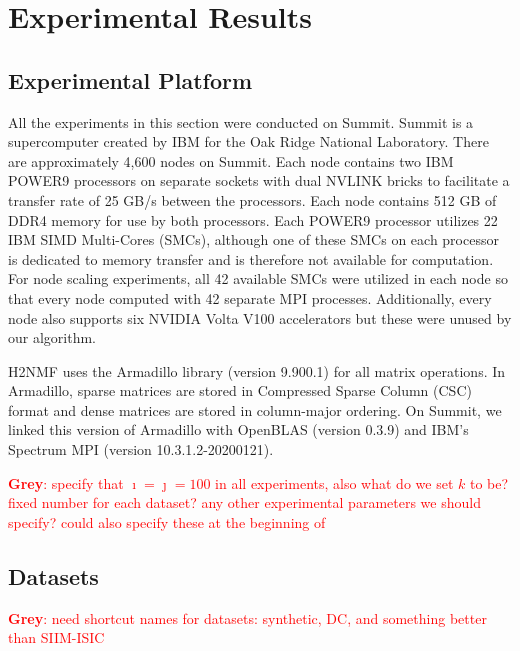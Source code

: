 \documentclass[conference,compsoc]{IEEEtran}
\newcommand{\GB}[1]{\textcolor{red}{\textbf{Grey}: #1}}
\newcommand{\image}{SIIM-ISIC}
\begin{document}
\section{Experimental Results}
\label{sec:results}

\subsection{Experimental Platform}
\label{sec:summit}

All the experiments in this section were conducted on Summit. Summit is a supercomputer created by IBM for the Oak Ridge National Laboratory. 
There are approximately 4,600 nodes on Summit. Each node contains two IBM POWER9 processors on separate sockets with dual NVLINK bricks to facilitate a transfer rate of 
25 GB/s between the processors. Each node contains 512 GB of DDR4 memory for use by both processors. Each POWER9 processor utilizes 22 IBM SIMD Multi-Cores (SMCs), 
although one of these SMCs on each processor is dedicated to memory transfer and is therefore not available for computation. 
For node scaling experiments, all 42 available SMCs were utilized in each node so that every node computed with 42 separate MPI processes.
Additionally, every node also supports six NVIDIA Volta V100 accelerators but these were unused by our algorithm. 

H2NMF uses the Armadillo library (version 9.900.1) for all matrix operations. 
In Armadillo, sparse matrices are stored in Compressed Sparse Column (CSC) format and dense matrices are stored in column-major ordering.
On Summit, we linked this version of Armadillo with OpenBLAS (version 0.3.9) and IBM's Spectrum MPI (version 10.3.1.2-20200121).


\GB{specify that $\imath=\jmath=100$ in all experiments, also what do we set $k$ to be?  fixed number for each dataset?  any other experimental parameters we should specify? could also specify these at the beginning of \Cref{sec:perf}}


\subsection{Datasets}

\GB{need shortcut names for datasets: synthetic, DC, and something better than \image{}}
\end{document}
